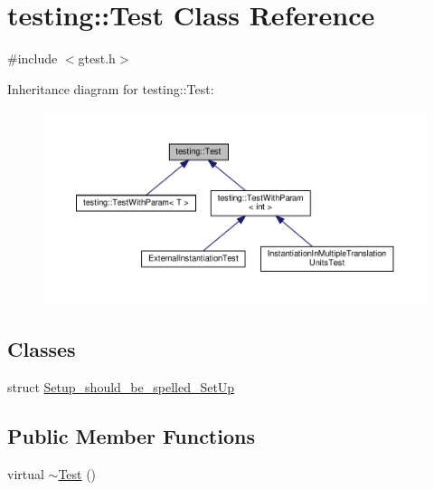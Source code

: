 \hypertarget{classtesting_1_1Test}{}\section{testing\+:\+:Test Class Reference}
\label{classtesting_1_1Test}


{\ttfamily \#include $<$gtest.\+h$>$}



Inheritance diagram for testing\+:\+:Test\+:\nopagebreak
\begin{figure}[H]
\begin{center}
\leavevmode
\includegraphics[width=350pt]{classtesting_1_1Test__inherit__graph}
\end{center}
\end{figure}
\subsection*{Classes}
\begin{DoxyCompactItemize}
\item 
struct \hyperlink{structtesting_1_1Test_1_1Setup__should__be__spelled__SetUp}{Setup\+\_\+should\+\_\+be\+\_\+spelled\+\_\+\+Set\+Up}
\end{DoxyCompactItemize}
\subsection*{Public Member Functions}
\begin{DoxyCompactItemize}
\item 
virtual \hyperlink{classtesting_1_1Test_ad99dc9b12208fd4bffc367f0a1e3df1b}{$\sim$\+Test} ()
\end{DoxyCompactItemize}

